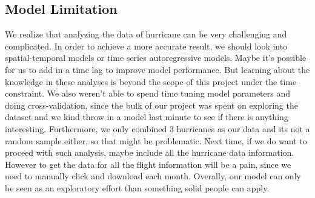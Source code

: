 \subsection{Model Limitation} 
We realize that analyzing the data of hurricane can be very challenging and complicated. In order to achieve a more accurate result, we should look into spatial-temporal models or time series autoregressive models. Maybe it's possible for us to add in a time lag to improve model performance. But learning about the knowledge in these analyses is beyond the scope of this project under the time constraint. We also weren't able to spend time tuning model parameters and doing cross-validation, since the bulk of our project was spent on exploring the dataset and we kind throw in a model last minute to see if there is anything interesting. Furthermore, we only combined 3 hurricanes as our data and its not a random sample either, so that might be problematic. Next time, if we do want to proceed with such analysis, maybe include all the hurricane data information. However to get the data for all the flight information will be a pain, since we need to manually click and download each month. Overally, our model can only be seen as an exploratory effort than something solid people can apply. 
